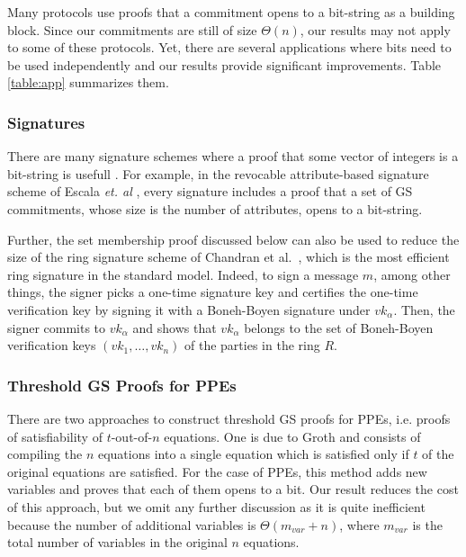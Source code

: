 Many protocols use proofs that a commitment opens to a bit-string as a 
  building block. 
Since our commitments are still of size $\Theta(n)$,
  our results may not apply to some of these protocols. 
Yet, there are several applications where 
  bits need to be used independently and our results provide 
  significant improvements.
Table \ref{table:app} summarizes them.
 
\subsubsection{Signatures} There are many signature schemes where a proof that some vector of integers is a bit-string is usefull \cite{PKC:BFPV11,SCN:BlaPoiVer12,RSA:Camacho13,AFRICACRYPT:EscHerMor11}. For example, in the revocable attribute-based signature scheme of Escala \textit{et. al} \cite{AFRICACRYPT:EscHerMor11}, every signature includes a proof that a set of GS commitments, whose size is the number of attributes, opens to a bit-string. 

Further, the set membership proof discussed below can also be used to reduce the size of the ring signature scheme of Chandran et al.~\cite{ICALP:ChaGroSah07}, which is the most efficient ring signature in the standard model. Indeed, to sign a message $m$, among other things, the signer picks a one-time signature key and certifies the one-time verification key by signing it with a Boneh-Boyen signature under $vk_\alpha$. Then, the signer commits to $vk_\alpha$ and shows that $vk_\alpha$ belongs to the set of Boneh-Boyen verification keys $(vk_1,\ldots,vk_n)$ of the parties in the ring $R$. 



\subsubsection{Threshold GS Proofs for PPEs} There are two approaches to construct threshold GS proofs for PPEs, i.e. proofs of satisfiability of $t$-out-of-$n$ equations. One is due to Groth \cite{AC:Groth06} and consists of compiling the $n$ equations into a single equation which is satisfied only if $t$ of the original equations are satisfied. For the case of PPEs, this method adds new variables and proves that each of them opens to a bit.  Our result reduces the cost of this approach, but we omit any further discussion as it is quite inefficient because the number of additional variables is $\Theta(m_{var}+n)$, where $m_{var}$ is the total number of variables in the original $n$ equations.

